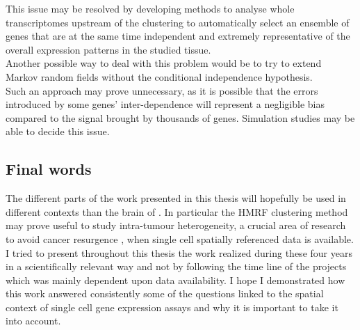   This issue may be resolved by developing methods to analyse whole transcriptomes upstream of the clustering to automatically select an ensemble of genes that are at the same time independent and extremely representative of the overall expression patterns in the studied tissue.\\
  
  Another possible way to deal with this problem would be to try to extend Markov random fields without the conditional independence hypothesis.\\
  
   Such an approach may prove unnecessary, as it is possible that the errors introduced by some genes' inter-dependence will represent a negligible bias compared to the signal brought by thousands of genes. Simulation studies may be able to decide this issue. 
   
\subsection{Final words}
    The different parts of the work presented in this thesis will hopefully be used in different contexts than the brain of \platy{}. In particular the HMRF clustering method may prove useful to study intra-tumour heterogeneity, a crucial area of research to avoid cancer resurgence \citep{meacham13,marusyk12,beckmann97}, when single cell spatially referenced data is available.\\
    
I tried to present throughout this thesis the work realized during these four years in a scientifically relevant way and not by following the time line of the projects which was mainly dependent upon data availability. I hope I demonstrated how this work answered consistently some of the questions linked to the spatial context of single cell gene expression assays and why it is important to take it into account.\\







	



